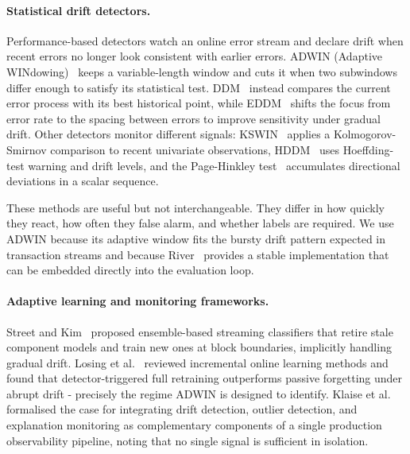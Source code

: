 \documentclass[pdflatex,sn-mathphys-num]{sn-jnl}
\theoremstyle{thmstyleone}
\theoremstyle{thmstyletwo}
\theoremstyle{thmstylethree}
\begin{document}
\paragraph{Statistical drift detectors.}
Performance-based detectors watch an online error stream and declare drift when
recent errors no longer look consistent with earlier errors. ADWIN (Adaptive
WINdowing)~\cite{bifet2007adwin} keeps a variable-length window and cuts it
when two subwindows differ enough to satisfy its statistical test.
DDM~\cite{gama2004ddm} instead compares the current error process with its best
historical point, while EDDM~\cite{baena2006eddm} shifts the focus from error
rate to the spacing between errors to improve sensitivity under gradual drift.
Other detectors monitor different signals: KSWIN~\cite{raab2020kswin} applies a
Kolmogorov-Smirnov comparison to recent univariate observations,
HDDM~\cite{frias2015hddm} uses Hoeffding-test warning and drift levels, and the
Page-Hinkley test~\cite{page1954phtest} accumulates directional deviations in a
scalar sequence.

These methods are useful but not interchangeable. They differ in how quickly
they react, how often they false alarm, and whether labels are required. We use
ADWIN because its adaptive window fits the bursty drift pattern expected in
transaction streams and because River~\cite{montiel2021river} provides a stable
implementation that can be embedded directly into the evaluation loop.

\paragraph{Adaptive learning and monitoring frameworks.}
Street and Kim~\cite{street2001streaming} proposed ensemble-based streaming
classifiers that retire stale component models and train new ones at block
boundaries, implicitly handling gradual drift. Losing et
al.~\cite{losing2018incremental} reviewed incremental online learning methods
and found that detector-triggered full retraining outperforms passive forgetting
under abrupt drift - precisely the regime ADWIN is designed to identify.
Klaise et al.~\cite{klaise2020monitoring} formalised the case for integrating
drift detection, outlier detection, and explanation monitoring as complementary
components of a single production observability pipeline, noting that no single
signal is sufficient in isolation.
\end{document}
